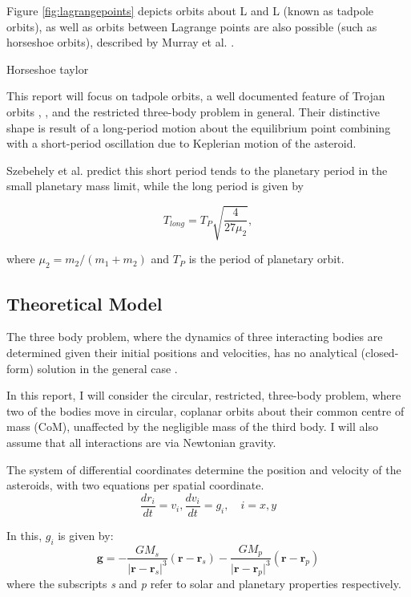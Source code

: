\documentclass[11pt, a4paper,twocolumn]{article} %
\begin{document}
Figure \ref{fig:lagrangepoints} depicts orbits about L and L (known as tadpole orbits), as well as orbits between Lagrange points are also possible (such as horseshoe orbits), described by Murray et al. \cite{Murray1999}.

Horseshoe taylor \cite{Taylor1981}

This report will focus on tadpole orbits, a well documented feature of Trojan orbits \cite{Garfinkel1983}, \cite{Dermott1981}, and the restricted three-body problem in general. Their distinctive shape is result of a long-period motion about the equilibrium point combining with a short-period oscillation due to Keplerian motion of the asteroid.

Szebehely et al. \cite{Szebehely1969} predict this short period tends to the planetary period in the small planetary mass limit, while the long period is given by

\begin{equation}
T_{long} = T_{P} \sqrt{\frac{4}{27 \mu_{2}}},  
\end{equation}

where $\mu_{2} = m_{2} / (m_{1} + m_{2})$ and $ T_{P} $ is the period of planetary orbit.

\subsection{Theoretical Model} \label{theory}
The three body problem, where the dynamics of three interacting bodies are determined given their initial positions and velocities, has no analytical (closed-form) solution in the general case \cite{Barrow2008}.

In this report, I will consider the circular, restricted, three-body problem, where two of the bodies move in circular, coplanar orbits about their common centre of mass (CoM), unaffected by the negligible mass of the third body. I will also assume that all interactions are via Newtonian gravity.

The system of differential coordinates determine the position and velocity of the asteroids, with two equations per spatial coordinate.
\begin{equation}
\frac{dr_{i}}{dt} = v_{i}, \frac{dv_{i}}{dt} = g_{i}, \quad i = x,y 
\end{equation}

In this, $g_{i}$ is given by:
\begin{equation}
\textbf{g}= - \frac{G M_{s}}{\lvert \textbf{r} - \textbf{r}_{s} \rvert ^{3}} (\textbf{r} - \textbf{r}_{s})
		 - \frac{G M_{p}}{\lvert \textbf{r} - \textbf{r}_{p} \rvert ^{3}} (\textbf{r} - \textbf{r}_{p})
\end{equation}
where the subscripts \textit{s} and \textit{p} refer to solar and planetary properties respectively.
\end{document}
